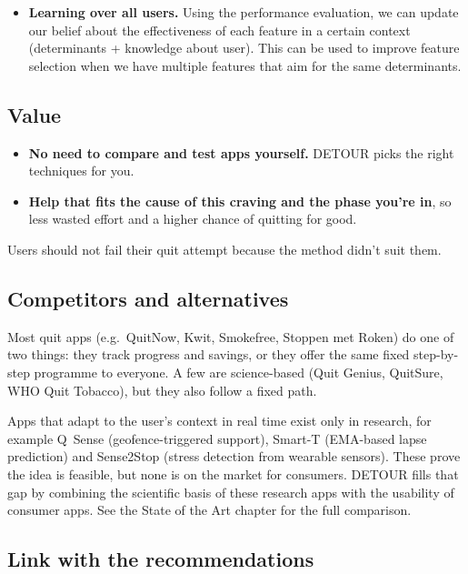\begin{itemize}
\begin{itemize}
    \end{itemize}
    \item \textbf{Learning over all users.} Using the performance evaluation, we can update our belief about the effectiveness of each feature in a certain context (determinants + knowledge about user). This can be used to improve feature selection when we have multiple features that aim for the same determinants.
\end{itemize}

\subsection{Value}
\label{subsec:value}

\begin{itemize}
    \item \textbf{No need to compare and test apps yourself.} DETOUR picks the right techniques for you.
    \item \textbf{Help that fits the cause of this craving and the phase you're in}, so less wasted effort and a higher chance of quitting for good.
\end{itemize}

Users should not fail their quit attempt because the method didn't suit them.

\subsection{Competitors and alternatives}
\label{subsec:competitors}

Most quit apps (e.g.\ QuitNow, Kwit, Smokefree, Stoppen met Roken) do one of two things: they track progress and savings, or they offer the same fixed step-by-step programme to everyone. A few are science-based (Quit Genius, QuitSure, WHO Quit Tobacco), but they also follow a fixed path.

Apps that adapt to the user's context in real time exist only in research, for example Q~Sense (geofence-triggered support), Smart-T (EMA-based lapse prediction) and Sense2Stop (stress detection from wearable sensors). These prove the idea is feasible, but none is on the market for consumers. DETOUR fills that gap by combining the scientific basis of these research apps with the usability of consumer apps. See the State of the Art chapter for the full comparison.

\subsection{Link with the recommendations}
\label{subsec:recommendations}

